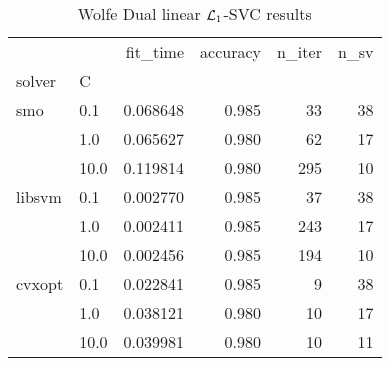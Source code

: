 \begin{table}[H]
\centering
\caption{Wolfe Dual linear $\protect \mathcal{L}_1$-SVC results}
\label{linear_dual_l1_svc_cv_results}
\begin{tabular}{llrrrr}
\toprule
       &      &  fit\_time &  accuracy &  n\_iter &  n\_sv \\
solver & C &           &           &         &       \\
\midrule
smo & 0.1  &  0.068648 &     0.985 &      33 &    38 \\
       & 1.0  &  0.065627 &     0.980 &      62 &    17 \\
       & 10.0 &  0.119814 &     0.980 &     295 &    10 \\
libsvm & 0.1  &  0.002770 &     0.985 &      37 &    38 \\
       & 1.0  &  0.002411 &     0.985 &     243 &    17 \\
       & 10.0 &  0.002456 &     0.985 &     194 &    10 \\
cvxopt & 0.1  &  0.022841 &     0.985 &       9 &    38 \\
       & 1.0  &  0.038121 &     0.980 &      10 &    17 \\
       & 10.0 &  0.039981 &     0.980 &      10 &    11 \\
\bottomrule
\end{tabular}
\end{table}
